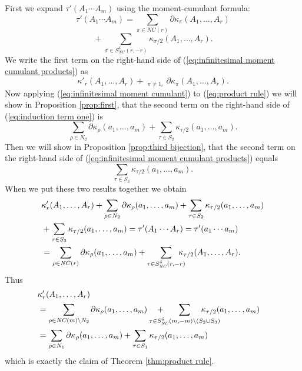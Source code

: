 \documentclass[11pt]{amsart}
\theoremstyle{definition}
\numberwithin{theorem}{section}
\newcommand{\NC}{\mathit{NC}}
\begin{document}
First we expand $\tau'(A_1 \cdots A_m)$ using the moment-cumulant formula:
\begin{equation}\label{eq:infinitesimal moment cumulant products}
\tau'(A_1 \cdots A_m)
=
\sum_{\pi \in \NC(r)} \partial \kappa_\pi(A_1, \dots, A_r)
\end{equation}
\[
\mbox{} + 
\sum_{\sigma \in S_\NC^\delta(r, -r)} \kappa_{\sigma/2}(A_1, \dots, A_r).
\]
We write the first term on the right-hand side of
(\ref{eq:infinitesimal moment cumulant products}) as
\begin{equation}\label{eq:induction term one}
\kappa'_r(A_1, \dots, A_r)
+
\mathop{\sum_{\pi \in\NC(r)}}_{\pi \not= 1_r}
\partial\kappa_\pi(A_1, \dots, A_r).
\end{equation}
Now applying (\ref{eq:infinitesimal moment cumulant}) to
(\ref{eq:product rule}) we will show in Proposition
\ref{prop:first}, that the second term on the right-hand
side of (\ref{eq:induction term one}) is
\begin{equation}\label{eq:product first step}
\sum_{\rho \in N_2} \partial \kappa_\rho(a_1, \dots, a_m)
+
\sum_{\tau \in S_2} \kappa_{\tau/2}(a_1, \dots, a_m).
\end{equation}
Then we will show in Proposition \ref{prop:third bijection},
that the second term on the right-hand side of
(\ref{eq:infinitesimal moment cumulant products}) equals
\begin{equation}\label{eq:product second step}
\sum_{\tau \in S_3}
\kappa_{\tau/2}(a_1, \dots, a_m).
\end{equation}
When we put these two results together we obtain 
\begin{align}\label{eq:combined formulas}
& 
\kappa'_r(A_1, \dots, A_r) +
\sum_{\rho \in N_2} \partial \kappa_\rho(a_1, \dots, a_m) 
+
\sum_{\tau \in S_2}  \kappa_{\tau/2}(a_1, \dots, a_m) \notag\\
& \mbox{} +
\sum_{\tau \in S_3} \kappa_{\tau/2}(a_1, \dots, a_m) 
= \tau'(A_1 \cdots A_r) = \tau'(a_1 \cdots a_m)\notag \\
& \mbox{} =
\sum_{\rho \in \NC(r)} \partial \kappa_\rho(a_1, \dots, a_m)
 + 
\sum_{\tau \in S_\NC^\delta(r, -r)} \kern-1em
\kappa_{\tau/2}(A_1, \dots, A_r).
\end{align}
Thus
\begin{align*}\lefteqn{
\kappa'_r(A_1, \dots, A_r)} \\
&  =
\sum_{\rho \in \NC(m) \setminus N_2} \partial \kappa_\rho(a_1, \dots, a_m)
\kern1em + \kern-2em
\sum_{\tau \in S_\NC^\delta(m, -m) \setminus (S_2 \cup S_3)} \kern-2.5em
 \kappa_{\tau/2}(a_1, \dots, a_m)  \\
& =
\sum_{\rho \in N_1} \partial \kappa_\rho(a_1, \dots, a_m)
+
\sum_{\tau \in S_1}  \kappa_{\tau/2}(a_1, \dots, a_m) 
\end{align*}
which is exactly the claim of Theorem \ref{thm:product rule}.
\end{document}
